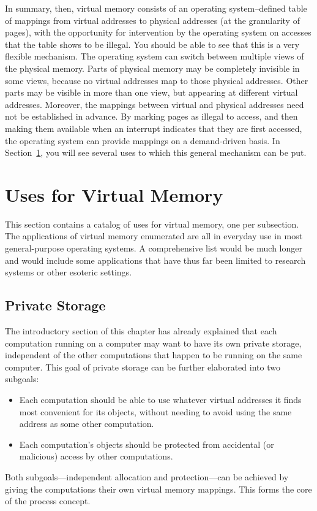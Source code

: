In summary, then, virtual memory consists of an
operating system--defined table of mappings from virtual addresses to
physical addresses (at the granularity of pages), with the opportunity
for intervention by the operating system on accesses that the table
shows to be illegal.  You should be able to see that this is a very
flexible mechanism.  The operating system can switch between multiple
views of the physical memory.  Parts of physical memory may be
completely invisible in some views, because no virtual addresses map
to those physical addresses.  Other parts may be visible in more than
one view, but appearing at different virtual addresses.  Moreover, the
mappings between virtual and physical addresses need not be
established in advance.  By marking pages as illegal to access, and
then making them available when an interrupt indicates that they are
first accessed, the operating system can provide mappings on a
demand-driven basis.  In Section~\ref{vm-uses-section}, you will see several
uses to which this general mechanism can be put.

\section{Uses for Virtual Memory}\label{vm-uses-section}

This section contains a catalog of uses for virtual memory, one per subsection.
The applications of virtual memory enumerated are all
in everyday use in most general-purpose operating systems.  A
comprehensive list would be much longer and would include some
applications that have thus far been limited to research systems or
other esoteric settings.

\subsection{Private Storage}\label{vm-private-storage-section}

The introductory section of this chapter has already explained that each computation
running on a computer may want to have its own private storage,
independent of the other computations that happen to be running on the
same computer.  This goal of private storage can be further elaborated
into two subgoals:
\begin{itemize}
\item
Each computation should be able to use whatever virtual addresses it
finds most convenient for its objects, without needing to avoid using
the same address as some other computation.
\item
Each computation's objects should be protected from accidental (or
malicious) access by other computations.
\end{itemize}
Both subgoals---independent allocation and protection---can be
achieved by giving the computations their own virtual memory
mappings.  This forms the core of the process concept.

